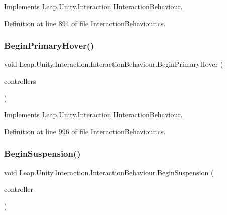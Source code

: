 Implements \mbox{\hyperlink{interface_leap_1_1_unity_1_1_interaction_1_1_i_interaction_behaviour_af4c8881fd3bc49d0ea7d09e578c571de}{Leap.\+Unity.\+Interaction.\+I\+Interaction\+Behaviour}}.



Definition at line 894 of file Interaction\+Behaviour.\+cs.

\mbox{\label{class_leap_1_1_unity_1_1_interaction_1_1_interaction_behaviour_addb5ab253e3f6556c278f205ada2f509}} 
\subsubsection{\texorpdfstring{BeginPrimaryHover()}{BeginPrimaryHover()}}
{\footnotesize\ttfamily void Leap.\+Unity.\+Interaction.\+Interaction\+Behaviour.\+Begin\+Primary\+Hover (\begin{DoxyParamCaption}\item[{List$<$ \mbox{\hyperlink{class_leap_1_1_unity_1_1_interaction_1_1_interaction_controller}{Interaction\+Controller}} $>$}]{controllers }\end{DoxyParamCaption})}



Implements \mbox{\hyperlink{interface_leap_1_1_unity_1_1_interaction_1_1_i_interaction_behaviour_ad653494de7b56532718a6b8dc3d9b412}{Leap.\+Unity.\+Interaction.\+I\+Interaction\+Behaviour}}.



Definition at line 996 of file Interaction\+Behaviour.\+cs.

\mbox{\label{class_leap_1_1_unity_1_1_interaction_1_1_interaction_behaviour_a31664a1bceac985662d8ed4796af5250}} 
\subsubsection{\texorpdfstring{BeginSuspension()}{BeginSuspension()}}
{\footnotesize\ttfamily void Leap.\+Unity.\+Interaction.\+Interaction\+Behaviour.\+Begin\+Suspension (\begin{DoxyParamCaption}\item[{\mbox{\hyperlink{class_leap_1_1_unity_1_1_interaction_1_1_interaction_controller}{Interaction\+Controller}}}]{controller }\end{DoxyParamCaption})}



